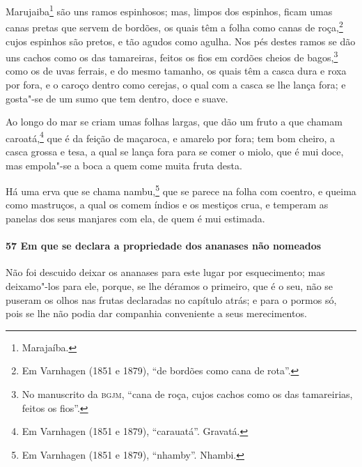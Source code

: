 Marujaiba\footnote{ Marajaíba.} são uns ramos espinhosos; mas, limpos dos espinhos, ficam
umas canas pretas que servem de bordões, os quais têm a folha como canas de
roça,\footnote{ Em Varnhagen (1851 e 1879), ``de bordões como cana de rota''.} cujos
espinhos são pretos, e tão agudos como agulha. Nos pés destes ramos se dão uns cachos como
os das tamareiras, feitos os fios em cordões cheios de bagos,\footnote{ No manuscrito da
\textsc{bgjm}, ``cana de roça, cujos cachos como os das tamareirias, feitos os fios''.}
como os de uvas ferrais, e do mesmo tamanho, 
os quais têm a casca dura e roxa por fora, e o caroço dentro como cerejas, o
qual com a casca se lhe lança fora; e gosta"-se de um sumo que tem dentro, doce e suave.

Ao longo do mar se criam umas folhas largas, que dão um fruto a que chamam
caroatá,\footnote{ Em Varnhagen (1851 e 1879), ``carauatá''. Gravatá.} que é da feição de
maçaroca, e amarelo por fora; tem bom cheiro, a casca grossa e tesa, a qual se lança fora
para se comer o miolo, que é mui doce, mas empola"-se a boca a quem come muita fruta desta.

Há uma erva que se chama nambu,\footnote{ Em Varnhagen (1851 e 1879), ``nhamby''. Nhambi.}
que se parece na folha com coentro, e queima como mastruços, a qual os comem índios e os
mestiços crua, e temperam as panelas dos seus manjares com ela, de quem é mui estimada.

\paragraph{57 Em que se declara a propriedade dos ananases não nomeados}

Não foi descuido deixar os ananases para este lugar por esquecimento; mas deixamo"-los para
ele, porque, se lhe déramos o primeiro, que é o seu, não se puseram os olhos nas frutas
declaradas no capítulo atrás; e para o pormos só, pois se lhe não podia dar companhia
conveniente a seus merecimentos.


